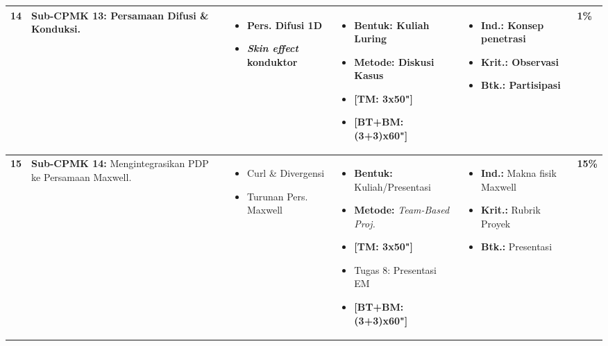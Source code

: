 \documentclass[11pt,a4paper]{article}
\begin{document}
\begin{longtable}{|C{0.6cm}|L{4.2cm}|L{4.5cm}|L{4.5cm}|L{3.5cm}|C{1.1cm}|}
\textbf{14} & \textbf{Sub-CPMK 13:} Persamaan Difusi \& Konduksi. & \vspace{-4mm} \begin{itemize}[leftmargin=*, noitemsep] \item Pers. Difusi 1D \item \textit{Skin effect} konduktor \end{itemize} \vspace{-4mm} & \vspace{-4mm} \begin{itemize}[leftmargin=*, noitemsep] \item \textbf{Bentuk:} Kuliah Luring \item \textbf{Metode:} Diskusi Kasus \item \textbf{[TM: 3x50"]} \item \textbf{[BT+BM: (3+3)x60"]} \end{itemize} \vspace{-4mm} & \vspace{-4mm} \begin{itemize}[leftmargin=*, noitemsep] \item \textbf{Ind.:} Konsep penetrasi \item \textbf{Krit.:} Observasi \item \textbf{Btk.:} Partisipasi \end{itemize} \vspace{-4mm} & \textbf{1\%} \\ \hline

\textbf{15} & \textbf{Sub-CPMK 14:} Mengintegrasikan PDP ke Persamaan Maxwell. & \vspace{-4mm} \begin{itemize}[leftmargin=*, noitemsep] \item Curl \& Divergensi \item Turunan Pers. Maxwell \end{itemize} \vspace{-4mm} & \vspace{-4mm} \begin{itemize}[leftmargin=*, noitemsep] \item \textbf{Bentuk:} Kuliah/Presentasi \item \textbf{Metode:} \textit{Team-Based Proj.} \item \textbf{[TM: 3x50"]} \item Tugas 8: Presentasi EM \item \textbf{[BT+BM: (3+3)x60"]} \end{itemize} \vspace{-4mm} & \vspace{-4mm} \begin{itemize}[leftmargin=*, noitemsep] \item \textbf{Ind.:} Makna fisik Maxwell \item \textbf{Krit.:} Rubrik Proyek \item \textbf{Btk.:} Presentasi \end{itemize} \vspace{-4mm} & \textbf{15\%} \\ \hline


\end{longtable}
\end{document}

